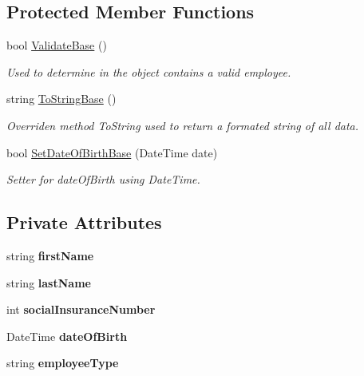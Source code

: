 \subsection*{Protected Member Functions}
\begin{DoxyCompactItemize}
\item 
bool \hyperlink{class_all_employees_1_1_employee_af679e8b4c683b9e94bec085062e5c88e}{Validate\+Base} ()
\begin{DoxyCompactList}\small\item\em Used to determine in the object contains a valid employee. \end{DoxyCompactList}\item 
string \hyperlink{class_all_employees_1_1_employee_a9e957826e327579e190cd5075789d1a9}{To\+String\+Base} ()
\begin{DoxyCompactList}\small\item\em Overriden method To\+String used to return a formated string of all data. \end{DoxyCompactList}\item 
bool \hyperlink{class_all_employees_1_1_employee_ac8e625954f41a1e6c9039df61b020bc3}{Set\+Date\+Of\+Birth\+Base} (Date\+Time date)
\begin{DoxyCompactList}\small\item\em Setter for date\+Of\+Birth using Date\+Time. \end{DoxyCompactList}\end{DoxyCompactItemize}
\subsection*{Private Attributes}
\begin{DoxyCompactItemize}
\item 
\hypertarget{class_all_employees_1_1_employee_a04c4c16015aa2d889fd2042ce4b8a1d7}{}string {\bfseries first\+Name}\label{class_all_employees_1_1_employee_a04c4c16015aa2d889fd2042ce4b8a1d7}

\item 
\hypertarget{class_all_employees_1_1_employee_ac3721b61919ca9cd29a400620562170e}{}string {\bfseries last\+Name}\label{class_all_employees_1_1_employee_ac3721b61919ca9cd29a400620562170e}

\item 
\hypertarget{class_all_employees_1_1_employee_a31f55bb91fe0871c5d9a3cb77f44a4df}{}int {\bfseries social\+Insurance\+Number}\label{class_all_employees_1_1_employee_a31f55bb91fe0871c5d9a3cb77f44a4df}

\item 
\hypertarget{class_all_employees_1_1_employee_a00f33298e4408f0a0402a34c9aa2067a}{}Date\+Time {\bfseries date\+Of\+Birth}\label{class_all_employees_1_1_employee_a00f33298e4408f0a0402a34c9aa2067a}

\item 
\hypertarget{class_all_employees_1_1_employee_a246198254823dc5a10197029b17479b4}{}string {\bfseries employee\+Type}\label{class_all_employees_1_1_employee_a246198254823dc5a10197029b17479b4}

\end{DoxyCompactItemize}


